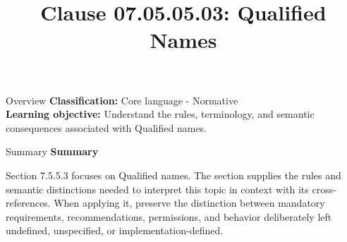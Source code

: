 \documentclass[10pt,letterpaper]{article}
\title{Clause 07.05.05.03: Qualified Names}
\author{}
\date{}
\begin{document}
\maketitle
\begin{CornellOverviewBox}{Overview}
\textbf{Classification:} Core language - Normative\\[2pt]
\textbf{Learning objective:} Understand the rules, terminology, and semantic consequences associated with Qualified names.
\end{CornellOverviewBox}\begin{CornellSummaryBox}{Summary}
{\sffamily\bfseries\color{Accent} Summary}\par\vspace{3pt}Section 7.5.5.3 focuses on Qualified names. The section supplies the rules and semantic distinctions needed to interpret this topic in context with its cross-references. When applying it, preserve the distinction between mandatory requirements, recommendations, permissions, and behavior deliberately left undefined, unspecified, or implementation-defined.
\end{CornellSummaryBox}
\end{document}
